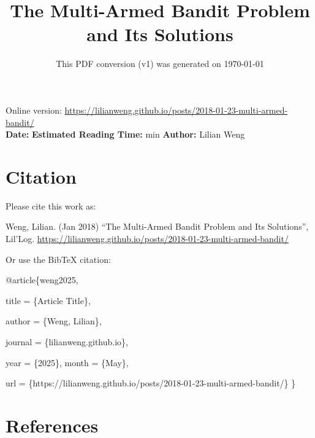 \documentclass[12pt]{article}
\title{The Multi-Armed Bandit Problem and Its Solutions}
\date{This PDF conversion (v1) was generated on \today\footnotemark}
\begin{document}
\maketitle
\begin{center}
    Online version: \url{https://lilianweng.github.io/posts/2018-01-23-multi-armed-bandit/} \\
    \textbf{Date:} \quad
    \textbf{Estimated Reading Time:}  min \quad
    \textbf{Author:} Lilian Weng
\end{center}




\newpage
\tableofcontents
\newpage
\vspace{1em}
\n\n\n\section{Citation}
Please cite this work as:

\begin{tcolorbox}[colback=black!5!white, colframe=black!80!white, boxrule=0.5pt, arc=2mm, left=1mm, right=1mm, top=1mm, bottom=1mm]
  Weng, Lilian. (Jan 2018) ``The Multi-Armed Bandit Problem and Its Solutions'', Lil'Log. \url{https://lilianweng.github.io/posts/2018-01-23-multi-armed-bandit/}
  \end{tcolorbox}

Or use the BibTeX citation:

\begin{tcolorbox}[
    colback=black!5!white,
    colframe=black!80!white,
    boxrule=0.5pt,
    arc=2mm,
    left=1mm,
    right=1mm,
    top=1mm,
    bottom=1mm,
    listing only,
    listing options={
      basicstyle=\ttfamily\footnotesize,
      breaklines=true,
      literate={\{}{{\char`\{}}1 {\}}{{\char`\}}}1
    }
  ]
  @article\{weng2025,

    title   = \{Article Title\},

    author  = \{Weng, Lilian\},

    journal = \{lilianweng.github.io\},

    year    = \{2025\},
    month   = \{May\},

    url     = \{https://lilianweng.github.io/posts/2018-01-23-multi-armed-bandit/\}\n
  \}
  \end{tcolorbox}

\newpage
\section{References}

\n
\end{document}
